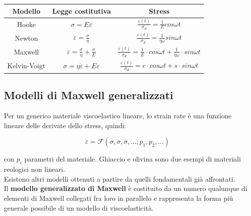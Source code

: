 \documentclass[a4paper,12pt]{book}
\begin{document}
\begin{table}[h!]
\renewcommand{\arraystretch}{1.3}
\setlength{\tabcolsep}{8pt}
\centering
\begin{tabular}{|c|c|c|}
    \hline
    \textbf{Modello} & \textbf{Legge costitutiva} & \textbf{Stress} \\
    \hline
    \rowcolor{colore7!40}
    Hooke & $\sigma = E \varepsilon$ & $\frac{\varepsilon(t)}{\sigma_d} = \frac{1}{E} cos \omega t$ \\
    \hline
    \rowcolor{colore2!40}
    Newton & $\dot{\varepsilon} = \frac{\sigma}{\eta}$ & $\frac{\varepsilon(t)}{\sigma_d} = \frac{1}{\eta \omega} sin \omega t$ \\
    \hline
    \rowcolor{colore4!40}
    Maxwell & $\dot{\varepsilon} = \frac{\sigma}{\eta} + \frac{\dot{\sigma}}{E}$ & $\frac{\varepsilon(t)}{\sigma_d} = \frac{1}{E} \cdot cos \omega t + \frac{1}{\eta \omega} \cdot sin \omega t$ \\
    \hline
    \rowcolor{colore5!40}
    Kelvin-Voigt & $\sigma = \eta \dot{\varepsilon} + E \varepsilon$ & $\frac{\varepsilon(t)}{\sigma_d} = c \cdot cos \omega t + s \cdot sin \omega t$\\
    \hline
\end{tabular}
\end{table}

\subsection{\textcolor{colore7}{Modelli di Maxwell generalizzati}}

Per un generico materiale viscoelastico lineare, lo strain rate è una funzione lineare delle derivate dello stress, quindi:

\begin{equation}
    \dot{\varepsilon} = \mathcal{F}(\sigma, \dot{\sigma}, \ddot{\sigma}, \dots; p_1, p_2, \dots)
\end{equation}

\noindent
con $p_i$ parametri del materiale. Ghiaccio e olivina sono due esempi di materiali reologici non lineari.\\

\noindent
Esistono altri modelli ottenuti a partire da quelli fondamentali già affrontati.\\

\noindent
Il \textbf{modello generalizzato di Maxwell} è costituito da un numero qualunque di elementi di Maxwell collegati fra loro in parallelo e rappresenta la forma più generale possibile di un modello di viscoelasticità.
\end{document}
